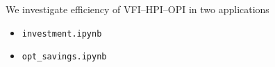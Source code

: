 \begin{frame}
    
    We investigate efficiency of VFI--HPI--OPI in two applications 

    \vspace{0.5em}
    \begin{itemize}
        \item \texttt{investment.ipynb}
    \vspace{0.5em}
        \item \texttt{opt\_savings.ipynb}
    \end{itemize}

\end{frame}













